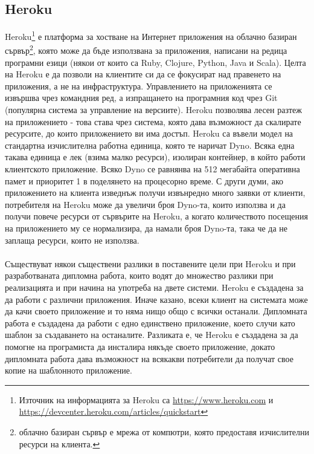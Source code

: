 \documentclass[pdftex,14pt,a4paper]{extreport}
\begin{document}
\subsection {Heroku}
Heroku\footnote{Източник на информацията за Heroku са \url{https://www.heroku.com} и \\\url{https://devcenter.heroku.com/articles/quickstart}} е платформа за хостване на Интернет приложения на облачно базиран сървър\footnote{облачно базиран сървър е мрежа от компютри, която предоставя изчислителни ресурси на клиента.}, която може да бъде използвана за приложения, написани на редица програмни езици (някои от които са Ruby, Clojure, Python, Java и Scala). Целта на Heroku е да позволи на клиентите си да се фокусират над правенето на приложения, а не на инфраструктура. Управлението на приложенията се извършва чрез командния ред, а изпращането на програмния код чрез Git (популярна система за управление на версиите). Heroku позволява лесен разтеж на приложението - това става чрез система, която дава възможност да скалирате ресурсите, до които приложението ви има достъп. Heroku са въвели модел на стандартна изчислителна работна единица, която те наричат Dyno. Всяка една такава единица е лек (взима малко ресурси), изолиран контейнер, в който работи клиентското приложение. Всяко Dyno се равнянва на 512 мегабайта оперативна памет и приоритет 1 в поделянето на процесорно време. С други думи, ако приложението на клиента изведнъж получи извънредно много заявки от клиенти, потребителя на Heroku може да увеличи броя Dyno-та, които използва и да получи повече ресурси от сървърите на Heroku, а когато количеството посещения на приложението му се нормализира, да намали броя Dyno-та, така че да не заплаща ресурси, които не използва.
\paragraph {}

Съществуват някои съществени разлики в поставените цели при Heroku и при разработваната дипломна работа, които водят до множество разлики при реализацията и при начина на употреба на двете системи. Heroku е създадена за да работи с различни приложения. Иначе казано, всеки клиент на системата може да качи своето приложение и то няма нищо общо с всички останали. Дипломната работа е създадена да работи с едно единствено приложение, което случи като шаблон за създаването на останалите. Разликата е, че Heroku е създадена за да помогне на програмиста да инсталира някъде своето приложение, докато дипломната работа дава възможност на всякакви потребители да получат свое копие на шаблонното приложение.
\end{document}
